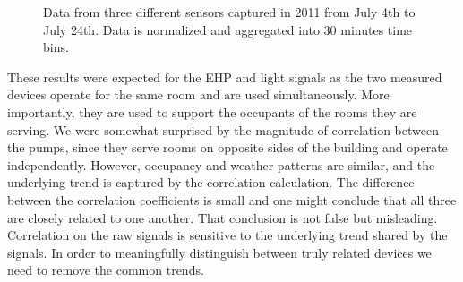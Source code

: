 \begin{figure}
 \caption{Data from three different sensors captured in 2011 from July 4th to July 24th. Data is normalized and aggregated into 30 minutes time bins.}
 \label{fig:raw}
\end{figure}



These results were expected for the EHP and light signals as the two measured devices operate for the same room 
and are used simultaneously.  More importantly, they are used to support the occupants of the rooms they are serving.
We were somewhat surprised by the magnitude of correlation between the pumps, since they serve rooms on
opposite sides of the building and operate independently.  However, occupancy and weather patterns are similar,
and the underlying trend is captured by the correlation calculation.
The difference between the correlation coefficients is small and one might conclude that all three are
closely related to one another.  That conclusion is not false but misleading.  Correlation on the raw 
signals is sensitive to the underlying trend shared by the signals.  In order to meaningfully distinguish between
truly related devices we need to remove the common trends.  



